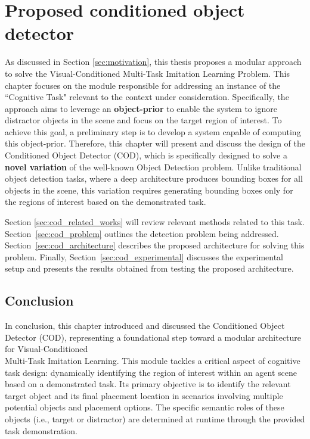 \chapter{Proposed conditioned object detector}
\label{ch:cod}
As discussed in Section \ref{sec:motivation}, this thesis proposes a modular approach to solve the Visual-Conditioned Multi-Task Imitation Learning Problem. This chapter focuses on the module responsible for addressing an instance of the ``Cognitive Task" relevant to the context under consideration. Specifically, the approach aims to leverage an \textbf{object-prior} to enable the system to ignore distractor objects in the scene and focus on the target region of interest. To achieve this goal, a preliminary step is to develop a system capable of computing this object-prior. Therefore, this chapter will present and discuss the design of the Conditioned Object Detector (COD), which is specifically designed to solve a \textbf{novel variation} of the well-known Object Detection problem. Unlike traditional object detection tasks, where a deep architecture produces bounding boxes for all objects in the scene, this variation requires generating bounding boxes only for the regions of interest based on the demonstrated task.

Section \ref{sec:cod_related_works} will review relevant methods related to this task. 
Section~\ref{sec:cod_problem} outlines the detection problem being addressed. Section~\ref{sec:cod_architecture} describes the proposed architecture for solving this problem. Finally, Section~\ref{sec:cod_experimental} discusses the experimental setup and presents the results obtained from testing the proposed architecture.






\section{Conclusion}
In conclusion, this chapter introduced and discussed the Conditioned Object Detector (COD), representing a foundational step toward a modular architecture for Visual-Conditioned \\ Multi-Task Imitation Learning. This module tackles a critical aspect of cognitive task design: dynamically identifying the region of interest within an agent scene based on a demonstrated task. Its primary objective is to identify the relevant target object and its final placement location in scenarios involving multiple potential objects and placement options. The specific semantic roles of these objects (i.e., target or distractor) are determined at runtime through the provided task demonstration.

